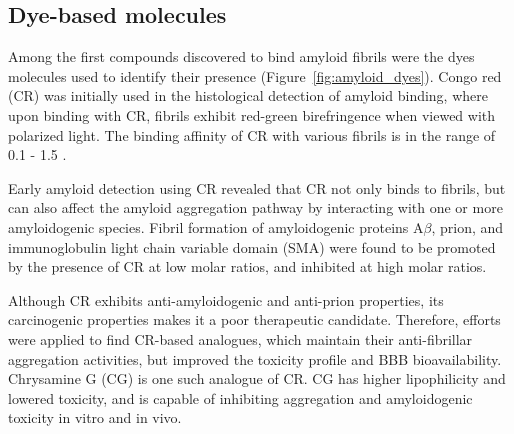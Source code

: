 
\subsection{Dye-based molecules}

Among the first compounds discovered to bind amyloid fibrils were the dyes molecules used to identify their presence (Figure~\ref{fig:amyloid_dyes}). Congo red (CR) was initially used in the histological detection of amyloid binding, where upon binding with CR, fibrils exhibit red-green birefringence when viewed with polarized light.\cite{Frid:2007bo} The binding affinity of CR with various fibrils is in the range of 0.1 - 1.5 \micromolar.\cite{Lendel:2009cg,Benditt:1970va,Klunk:1989vc}

Early amyloid detection using CR revealed that CR not only binds to fibrils, but can also affect the amyloid aggregation pathway by interacting with one or more amyloidogenic species.\cite{Caspi:1998vt}
Fibril formation of amyloidogenic proteins A$\beta$,\cite{Esler:1997bq} prion,\cite{Rudyk:2000ta} and immunoglobulin light chain variable domain (SMA)\cite{Kim:2003hv} were found to be promoted by the presence of CR at low molar ratios, and inhibited at high molar ratios. 

Although CR exhibits anti-amyloidogenic and anti-prion properties, its carcinogenic properties makes it a poor therapeutic candidate.\cite{Hawkes:2009gu} Therefore, efforts were applied to find CR-based analogues, which maintain their anti-fibrillar aggregation activities, but improved the toxicity profile and BBB bioavailability. Chrysamine G (CG) is one such analogue of CR. CG has higher lipophilicity and lowered toxicity, and is capable of inhibiting aggregation and amyloidogenic toxicity in vitro and in vivo.\cite{Klunk:1994um,Klunk:1998vm,Reinke:2007p155,Ishii:2002uf}

